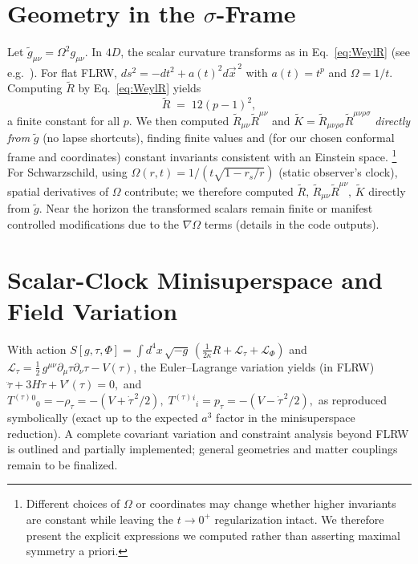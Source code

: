 \documentclass[11pt]{article}
\begin{document}
\section{Geometry in the $\sigma$-Frame}
Let \(\tilde g_{\mu\nu}=\Omega^2 g_{\mu\nu}\). In \(4D\), the scalar curvature transforms as in Eq.~\eqref{eq:WeylR} (see e.g.\ \cite{CarrollGR,WaldGR}).
For flat FLRW, $ds^2=-dt^2 + a(t)^2 d\vec x^{\,2}$ with $a(t)=t^p$ and \(\Omega=1/t\).
Computing \(\tilde R\) by Eq.~\eqref{eq:WeylR} yields
\begin{equation}
  \tilde R \;=\; 12(p-1)^2,
\end{equation}
a finite constant for all \(p\).
We then computed \(\tilde R_{\mu\nu}\tilde R^{\mu\nu}\) and \(\tilde K=\tilde R_{\mu\nu\rho\sigma}\tilde R^{\mu\nu\rho\sigma}\) \emph{directly from} \(\tilde g\) (no lapse shortcuts), finding finite values and (for our chosen conformal frame and coordinates) constant invariants consistent with an Einstein space.%
\footnote{Different choices of $\Omega$ or coordinates may change whether higher invariants are constant while leaving the \(t\to 0^+\) regularization intact. We therefore present the explicit expressions we computed rather than asserting maximal symmetry a priori.}
For Schwarzschild, using \(\Omega(r,t)=1/(t\sqrt{1-r_s/r})\) (static observer’s clock), spatial derivatives of \(\Omega\) contribute; we therefore computed \(\tilde R,\,\tilde R_{\mu\nu}\tilde R^{\mu\nu},\,\tilde K\) directly from \(\tilde g\). Near the horizon the transformed scalars remain finite or manifest controlled modifications due to the \(\nabla\Omega\) terms (details in the code outputs).

\section{Scalar-Clock Minisuperspace and Field Variation}
With action \(S[g,\tau,\Phi]=\int d^4x\,\sqrt{-g}\,( \frac{1}{2\kappa}R + \mathcal L_\tau + \mathcal L_\Phi )\) and \(\mathcal L_\tau=\frac{1}{2}\,g^{\mu\nu}\partial_\mu\tau\partial_\nu\tau - V(\tau)\),
the Euler–Lagrange variation yields (in FLRW)
\(
\ddot\tau + 3H\dot\tau + V'(\tau)=0,
\)
and
\(
T^{(\tau)}{}^0{}_0=-\rho_\tau=-(V+\dot\tau^{\,2}/2),\;
T^{(\tau)}{}^i{}_i=p_\tau=-(V-\dot\tau^{\,2}/2),
\)
as reproduced symbolically (exact up to the expected $a^3$ factor in the minisuperspace reduction).
A complete covariant variation and constraint analysis beyond FLRW is outlined and partially implemented; general geometries and matter couplings remain to be finalized.
\end{document}
